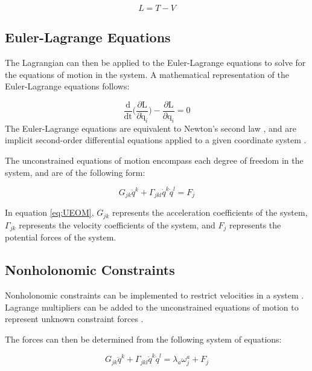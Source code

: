 \documentclass[12pt,letterpaper]{article}
\begin{document}
\begin{equation}
\label{eq:Lagrange}
L = T - V
\end{equation}

\subsection{Euler-Lagrange Equations}
The Lagrangian can then be applied to the Euler-Lagrange equations to solve for the equations of motion in the system. 
A mathematical representation of the Euler-Lagrange equations follows:

\begin{equation}
\label{eq:EL}
\frac{\text{d}}{\text{dt}} \bigg(\frac{\partial \text{L}}{\partial \dot{\text{q}}_{i}}\bigg) - \frac{\partial \text{L}}{\partial \text{q}_{i}} = 0
\end{equation}
The Euler-Lagrange equations are equivalent to Newton's second law \cite{NonholonomicPowerpoint}, and are implicit second-order differential equations applied to a given coordinate system \cite{Lewis}.
\par
The unconstrained equations of motion encompass each degree of freedom in the system, and are of the following form:

\begin{equation}
\label{eq:UEOM}
G_{jk} \ddot{q}^k + \Gamma_{jkl} \dot{q}^k\dot{q}^l  = F_{j}
\end{equation}

In equation \ref{eq:UEOM}, $G_{jk}$ represents the acceleration coefficients of the system, $\Gamma_{jk}$ represents the velocity coefficients of the system, and $F_j$ represents the potential forces of the system.

\subsection{Nonholonomic Constraints}
Nonholonomic constraints can be implemented to restrict velocities in a system \cite{LagrangeEquations}.
Lagrange multipliers can be added to the unconstrained equations of motion to represent unknown constraint forces \cite{ClassicalMechanics}.
\par
The forces can then be determined from the following system of equations:

\begin{equation}
\label{eq:CFE}
G_{jk} \ddot{q}^k + \Gamma_{jkl} \dot{q}^k\dot{q}^l  = \lambda_{a}\omega_{j}^{a} + F_{j}
\end{equation}
\end{document}
